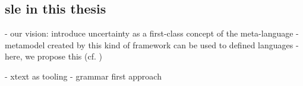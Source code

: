 \subsection[SLE in this thesis]{\gls{sle} in this thesis}


- our vision: introduce uncertainty as a first-class concept of the meta-language
- metamodel created by this kind of framework can be used to defined languages
- here, we propose this (cf. )

- xtext as tooling - grammar first approach